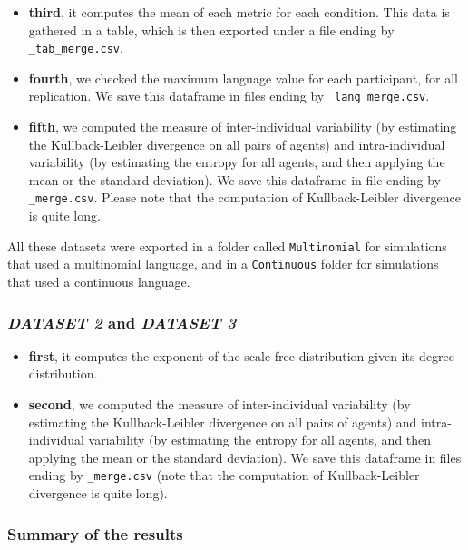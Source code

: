 \documentclass[
]{article}
\begin{document}
\begin{itemize}
\item
  \textbf{third}, it computes the mean of each metric for each
  condition. This data is gathered in a table, which is then exported
  under a file ending by \texttt{\_tab\_merge.csv}.
\item
  \textbf{fourth}, we checked the maximum language value for each
  participant, for all replication. We save this dataframe in files
  ending by \texttt{\_lang\_merge.csv}.
\item
  \textbf{fifth}, we computed the measure of inter-individual
  variability (by estimating the Kullback-Leibler divergence on all
  pairs of agents) and intra-individual variability (by estimating the
  entropy for all agents, and then applying the mean or the standard
  deviation). We save this dataframe in file ending by
  \texttt{\_merge.csv}. Please note that the computation of
  Kullback-Leibler divergence is quite long.
\end{itemize}

All these datasets were exported in a folder called \texttt{Multinomial}
for simulations that used a multinomial language, and in a
\texttt{Continuous} folder for simulations that used a continuous
language.

\hypertarget{dataset-2-and-dataset-3}{%
\subsubsection{\texorpdfstring{\emph{DATASET 2} and \emph{DATASET
3}}{DATASET 2 and DATASET 3}}\label{dataset-2-and-dataset-3}}

\begin{itemize}
\item
  \textbf{first}, it computes the exponent of the scale-free
  distribution given its degree distribution.
\item
  \textbf{second}, we computed the measure of inter-individual
  variability (by estimating the Kullback-Leibler divergence on all
  pairs of agents) and intra-individual variability (by estimating the
  entropy for all agents, and then applying the mean or the standard
  deviation). We save this dataframe in files ending by
  \texttt{\_merge.csv} (note that the computation of Kullback-Leibler
  divergence is quite long).
\end{itemize}

\hypertarget{summary-of-the-results}{%
\subsubsection{Summary of the results}\label{summary-of-the-results}}
\end{document}
